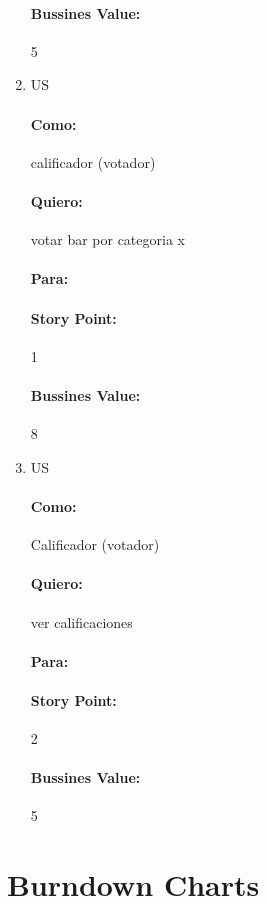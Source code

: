 \documentclass[10pt,a4paper]{article}
\begin{document}
\begin{enumerate}
\paragraph{Bussines Value:} 5


 \item US
\paragraph{Como:} calificador (votador)
\paragraph{Quiero:} votar bar por categoria x
\paragraph{Para:}
\paragraph{Story Point:}1
\paragraph{Bussines Value:} 8


 \item US
\paragraph{Como:} Calificador (votador)
\paragraph{Quiero:}ver calificaciones
\paragraph{Para:}
\paragraph{Story Point:}2
\paragraph{Bussines Value:}5

\end{enumerate}



\section{Burndown Charts}
\end{document}
